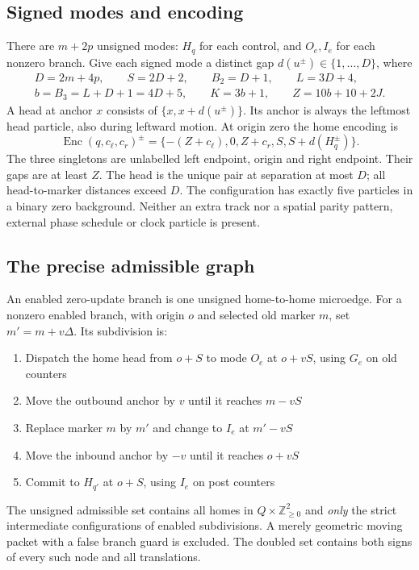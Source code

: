 \documentclass[11pt,a4paper]{article}
\numberwithin{equation}{section}
\newcommand{\Nge}{\mathbb Z_{\ge0}}\newcommand{\Nzero}{\mathbb N_0}
\begin{document}
\subsection{Signed modes and encoding}
There are $m+2p$ unsigned modes: $H_q$ for each control, and $O_e,I_e$ for each nonzero branch. Give each signed mode a distinct gap $d(u^\pm)\in\{1,\ldots,D\}$, where
\begin{equation}\label{fpa:tr:eq:constants}
\begin{gathered}
D=2m+4p,\qquad S=2D+2,\qquad B_2=D+1,\qquad L=3D+4,\\
b=B_3=L+D+1=4D+5,\qquad K=3b+1,\qquad Z=10b+10+2J.
\end{gathered}
\end{equation}
A head at anchor $x$ consists of $\{x,x+d(u^\pm)\}$. Its anchor is always the leftmost head particle, also during leftward motion. At origin zero the home encoding is
\begin{equation}\label{fpa:tr:eq:home}
\operatorname{Enc}(q,c_\ell,c_r)^\pm
=\{-(Z+c_\ell),0,Z+c_r,S,S+d(H_q^\pm)\}.
\end{equation}
The three singletons are unlabelled left endpoint, origin and right endpoint. Their gaps are at least $Z$. The head is the unique pair at separation at most $D$; all head-to-marker distances exceed $D$. The configuration has exactly five particles in a binary zero background. Neither an extra track nor a spatial parity pattern, external phase schedule or clock particle is present.

\subsection{The precise admissible graph}
An enabled zero-update branch is one unsigned home-to-home microedge. For a nonzero enabled branch, with origin $o$ and selected old marker $m$, set $m'=m+v\Delta$. Its subdivision is:
\begin{enumerate}
\item Dispatch the home head from $o+S$ to mode $O_e$ at $o+vS$, using $G_e$ on old counters
\item Move the outbound anchor by $v$ until it reaches $m-vS$
\item Replace marker $m$ by $m'$ and change to $I_e$ at $m'-vS$
\item Move the inbound anchor by $-v$ until it reaches $o+vS$
\item Commit to $H_{q'}$ at $o+S$, using $I_e$ on post counters
\end{enumerate}
The unsigned admissible set contains all homes in $Q\times\Nge^2$ and \emph{only} the strict intermediate configurations of enabled subdivisions. A merely geometric moving packet with a false branch guard is excluded. The doubled set contains both signs of every such node and all translations.
\end{document}
